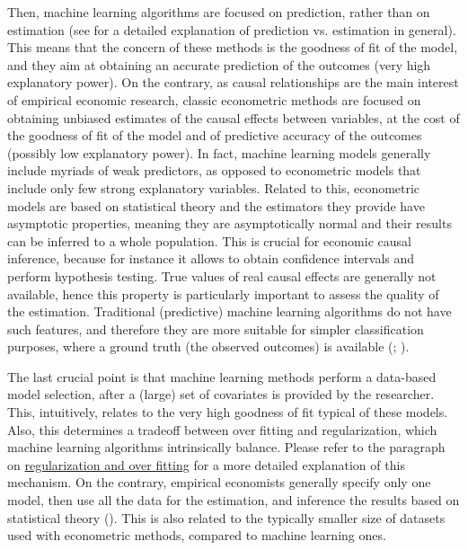 \documentclass[12pt,a4paper,openright,twoside]{book}
\newcommand{\customref}[2]{\hyperref[#1]{#2}}
\begin{document}
\begin{doublespacing}
Then, machine learning algorithms are focused on prediction, rather than on estimation (see \citealp{efron2020prediction} for a detailed explanation of prediction vs. estimation in general). This means that the concern of these methods is the goodness of fit of the model, and they aim at obtaining an accurate prediction of the outcomes (very high explanatory power). On the contrary, as causal relationships are the main interest of empirical economic research, classic econometric methods are focused on obtaining unbiased estimates of the causal effects between variables, at the cost of the goodness of fit of the model and of predictive accuracy of the outcomes (possibly low explanatory power). 
In fact, machine learning models generally include myriads of weak predictors, as opposed to econometric models that include only few strong explanatory variables.
Related to this, econometric models are based on statistical theory and the estimators they provide have asymptotic properties, meaning they are asymptotically normal and their results can be inferred to a whole population. This is crucial for economic causal inference, because for instance it allows to obtain confidence intervals and perform hypothesis testing. True values of real causal effects are generally not available, hence this property is particularly important to assess the quality of the estimation. Traditional (predictive) machine learning algorithms do not have such features, and therefore they are more suitable for simpler classification purposes, where a ground truth (the observed outcomes) is available (\citealp{athey2019}; \citealp{efron2020prediction}).

The last crucial point is that machine learning methods perform a data-based model selection, after a (large) set of covariates is provided by the researcher. This, intuitively, relates to the very high goodness of fit typical of these models. Also, this determines a tradeoff between over fitting and regularization, which machine learning algorithms intrinsically balance. Please refer to the paragraph on \customref{regofcv}{regularization and over fitting} for a more detailed explanation of this mechanism.
On the contrary, empirical economists generally specify only one model, then use all the data for the estimation, and inference the results based on statistical theory (\citealp{athey2019}). This is also related to the typically smaller size of datasets used with econometric methods, compared to machine learning ones.\\


\end{doublespacing}
\end{document}
